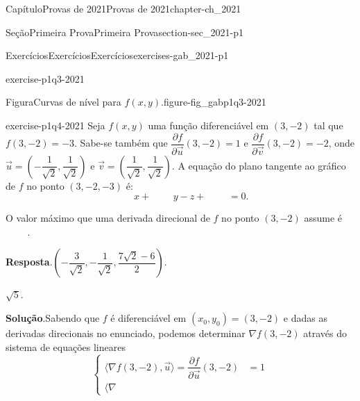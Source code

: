\documentclass[oneside,10pt,]{book}
\newcommand{\blocktitlefont}{\relax}
\numberwithin{equation}{section}
\begin{document}
\begin{chapterptx}{Capítulo}{Provas de 2021}{}{Provas de 2021}{}{}{chapter-ch_2021}
\begin{sectionptx}{Seção}{Primeira Prova}{}{Primeira Prova}{}{}{section-sec_2021-p1}
\begin{exercises-subsection-numberless}{Exercícios}{Exercícios}{}{Exercícios}{}{}{exercises-gab_2021-p1}
\begin{divisionexercise}{3}{}{}{exercise-p1q3-2021}
\begin{figureptx}{Figura}{Curvas de nível para \(f(x,y)\).}{figure-fig_gabp1q3-2021}{}
\begin{image}{0.25}{0.5}{0.25}{}%
%
\end{image}%
\tcblower
\end{figureptx}%
%
\end{divisionexercise}%
\begin{divisionexercise}{4}{}{}{exercise-p1q4-2021}%
Seja \(f(x,y)\) uma função diferenciável em \((3,-2)\) tal que \(f(3,-2)=-3\). Sabe-se também que \(\dfrac{\partial
f}{\partial \vec{u}}(3,-2)=1\) e \(\dfrac{\partial
f}{\partial \vec{v}}(3,-2)=-2\), onde \(\vec{u}=\left(-\dfrac{1}{\sqrt{2}},\dfrac{1}{\sqrt{2}}\right)\) e \(\vec{v}=\left(\dfrac{1}{\sqrt{2}},\dfrac{1}{\sqrt{2}}\right)\). A equação do plano tangente ao gráfico de \(f\) no ponto \((3,-2,-3)\) é:%
\begin{equation*}
\boxed{\phantom{AAA}}x+\boxed{\phantom{AAA}}y-z+\boxed{\phantom{AAA}}=0.
\end{equation*}
%
\par
O valor máximo que uma derivada direcional de \(f\) no ponto \((3,-2)\) assume é \(\boxed{\phantom{AAA}}\).%
\par\smallskip%
\noindent\textbf{\blocktitlefont Resposta}.\hypertarget{answer-p1q4-2021-b}{}\quad{}\(\left(-\dfrac{3}{\sqrt{2}},-\dfrac{1}{\sqrt{2}},\dfrac{7\sqrt{2}-6}{2}\right)\).%
\par
\(\sqrt{5}\).%
\par\smallskip%
\noindent\textbf{\blocktitlefont Solução}.\hypertarget{solution-p1q4-2021-c}{}\quad{}Sabendo que \(f\) é diferenciável em \((x_0,y_0)=(3,-2)\) e dadas as derivadas direcionais no enunciado, podemos determinar \(\nabla f(3,-2)\) através do sistema de equações lineares%
\begin{equation*}
\begin{cases} \big\langle\nabla
f(3,-2),\vec{u}\big\rangle= \dfrac{\partial f}{\partial
\vec{u}}(3,-2)&=1\\ \big\langle\nabla

\end{cases}
\end{equation*}
\end{divisionexercise}
\end{exercises-subsection-numberless}
\end{sectionptx}
\end{chapterptx}
\end{document}
